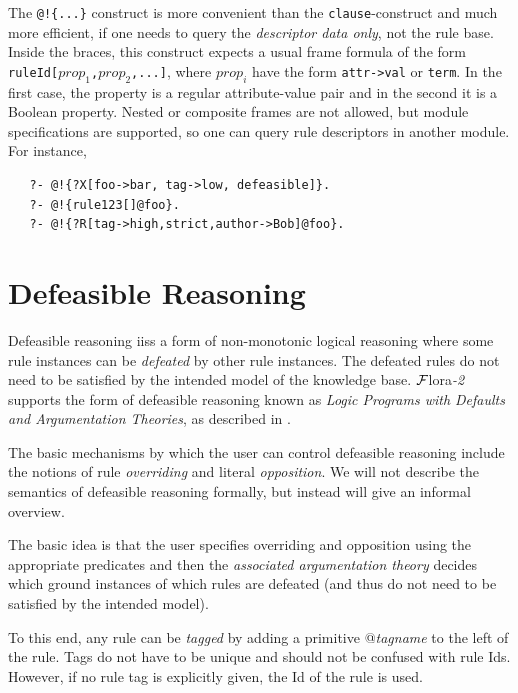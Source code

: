 \documentclass[11pt]{article}
\newcommand{\FLORA}{{\mbox{\sc ${\cal F}${lora}\rm\emph{-2}}}\xspace}
\begin{document}
The \texttt{@!\{...\}} construct is more convenient than the
\texttt{clause}-construct and much more efficient,
if one needs to query the \emph{descriptor data
  only}, not the rule base. Inside the braces, this construct expects a
usual frame formula of the form \texttt{ruleId[$prop_1$,$prop_2$,...]}, where
$prop_i$ have the form \texttt{attr->val} or \texttt{term}. In the first
case, the property is a regular attribute-value pair and in the second it
is a Boolean property. Nested or composite frames are not allowed, but
module specifications are supported, so one can query rule descriptors in
another module. For instance,
\begin{verbatim}
   ?- @!{?X[foo->bar, tag->low, defeasible]}.
   ?- @!{rule123[]@foo}.
   ?- @!{?R[tag->high,strict,author->Bob]@foo}.
\end{verbatim}


\section{Defeasible Reasoning}
\label{sec-defeasible}

Defeasible reasoning iiss a form of non-monotonic logical reasoning where
some rule instances can be \emph{defeated} by other rule instances. The
defeated rules do not need to be satisfied by the intended model of the
knowledge base. \FLORA supports the form of defeasible reasoning known as
\emph{Logic Programs with Defaults and Argumentation Theories}, as
described in \cite{lpda-iclp-09}.  

The basic mechanisms by which the user can control defeasible
reasoning include the notions of rule \emph{overriding} and literal
\emph{opposition}.  We will not describe the semantics of defeasible
reasoning formally, but instead will give an informal overview.

The basic idea is that the user specifies overriding and
opposition using the appropriate predicates and then the \emph{associated
argumentation theory} decides which ground instances of which rules are
defeated (and thus do not need to be satisfied by the intended model).  

To this end, any rule can be \emph{tagged} by adding
a primitive @{\emph{tagname}} to the left of the rule. Tags do not have to
be unique and should not be confused with rule Ids. However, if no rule tag
is explicitly given, the Id of the rule is used.
\end{document}
